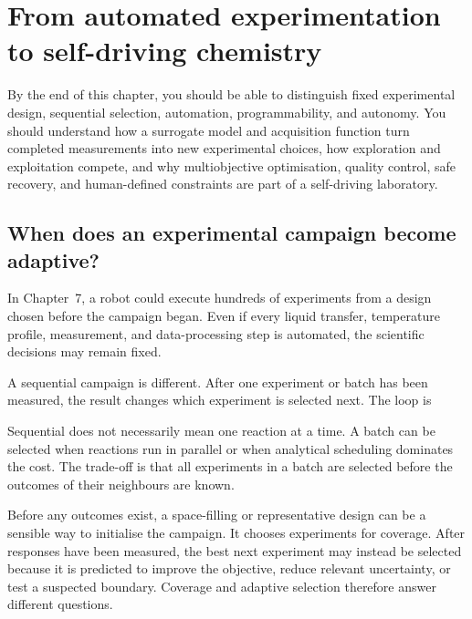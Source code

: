 
\chapter{From automated experimentation to self-driving chemistry}

\begin{notebox}
  By the end of this chapter, you should be able to distinguish fixed experimental design, sequential selection, automation, programmability, and autonomy.
  You should understand how a surrogate model and acquisition function turn completed measurements into new experimental choices, how exploration and exploitation compete, and why multiobjective optimisation, quality control, safe recovery, and human-defined constraints are part of a self-driving laboratory.
\end{notebox}

\section{When does an experimental campaign become adaptive?}

In Chapter~7, a robot could execute hundreds of experiments from a design chosen before the campaign began.
Even if every liquid transfer, temperature profile, measurement, and data-processing step is automated, the scientific decisions may remain fixed.

A sequential campaign is different.
After one experiment or batch has been measured, the result changes which experiment is selected next.
The loop is


Sequential does not necessarily mean one reaction at a time.
A batch can be selected when reactions run in parallel or when analytical scheduling dominates the cost.
The trade-off is that all experiments in a batch are selected before the outcomes of their neighbours are known.

Before any outcomes exist, a space-filling or representative design can be a sensible way to initialise the campaign.
It chooses experiments for coverage.
After responses have been measured, the best next experiment may instead be selected because it is predicted to improve the objective, reduce relevant uncertainty, or test a suspected boundary.
Coverage and adaptive selection therefore answer different questions.

